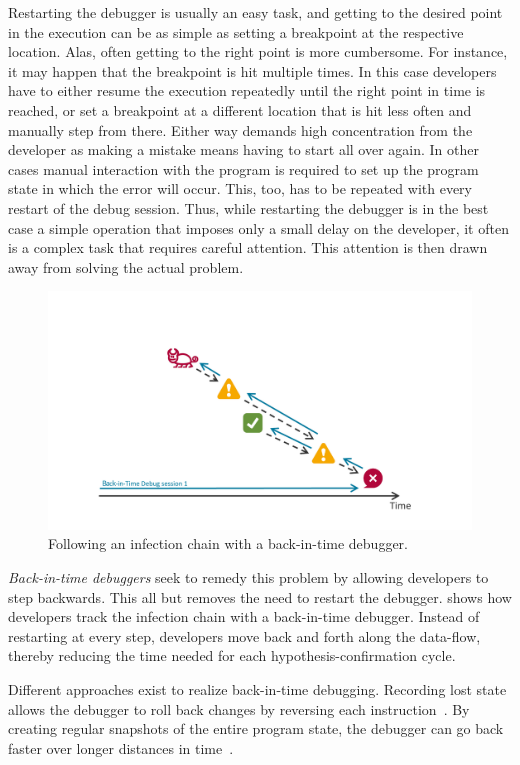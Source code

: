 Restarting the debugger is usually an easy task, and getting to the desired point in the execution can be as simple as setting a breakpoint at the respective location.
Alas, often getting to the right point is more cumbersome.
For instance, it may happen that the breakpoint is hit multiple times.
In this case developers have to either resume the execution repeatedly until the right point in time is reached, or set a breakpoint at a different location that is hit less often and manually step from there.
Either way demands high concentration from the developer as making a mistake means having to start all over again.
In other cases manual interaction with the program is required to set up the program state in which the error will occur.
This, too, has to be repeated with every restart of the debug session.
Thus, while restarting the debugger is in the best case a simple operation that imposes only a small delay on the developer, it often is a complex task that requires careful attention.
This attention is then drawn away from solving the actual problem.

\begin{figure}[th]
\centering
\includegraphics[width=.9\linewidth]{img/workflow-odb}
\caption{Following an infection chain with a back-in-time debugger.}
\label{fig:workflow-odb}
\end{figure}

\emph{Back-in-time debuggers} seek to remedy this problem by allowing developers to step backwards.
This all but removes the need to restart the debugger.
 shows how developers track the infection chain with a back-in-time debugger.
Instead of restarting at every step, developers move back and forth along the data-flow, thereby reducing the time needed for each hypothesis-confirmation cycle.

Different approaches exist to realize back-in-time debugging.
Recording lost state allows the debugger to roll back changes by reversing each instruction~\cite{feldman88:igor_a_system,cook02:reverse_execution_of_java,lieberman95:zstep_95_a_reversible}.
By creating regular snapshots of the entire program state, the debugger can go back faster over longer distances in time~\cite{boothe00:efficient_algorithms_for_bidirectional,tolmach93:a_debugger_for_standard}.

